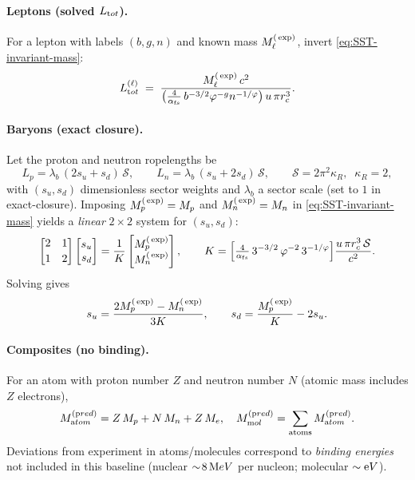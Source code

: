\documentclass[reprint,aps,onecolumn,nofootinbib]{revtex4-2}
\begin{document}
    \paragraph{Leptons (solved $L_{\textrm tot}$).}
        For a lepton with labels $(b,g,n)$ and known mass $M_\ell^{\textrm(\exp)}$, invert \eqref{eq:SST-invariant-mass}:
        \[
            L_{\textrm tot}^{(\ell)} \;=\;
            \frac{M_\ell^{\textrm(\exp)}\,c^2}{\big(\tfrac{4}{\alpha_{\textrm fs}}\,b^{-3/2}\varphi^{-g}n^{-1/\varphi}\big)\,u\,\pi r_c^3}.
        \]

    \paragraph{Baryons (exact closure).}
        Let the proton and neutron ropelengths be
        \[
            L_p=\lambda_b\,(2s_u+s_d)\,\mathcal S,\qquad
            L_n=\lambda_b\,(s_u+2s_d)\,\mathcal S,\qquad
            \mathcal S=2\pi^2\kappa_R,\;\;\kappa_R=2,
        \]
        with $(s_u,s_d)$ dimensionless sector weights and $\lambda_b$ a sector scale (set to $1$ in exact-closure).
        Imposing $M_p^{\textrm(\exp)}=M_p$ and $M_n^{\textrm(\exp)}=M_n$ in \eqref{eq:SST-invariant-mass} yields a \emph{linear} $2\times2$ system for $(s_u,s_d)$:
        \[
            \begin{bmatrix}
            2 & 1\\[2pt]
            1 & 2
            \end{bmatrix}
            \begin{bmatrix}
            s_u\\ s_d
            \end{bmatrix}

            =
            \frac{1}{K}
            \begin{bmatrix}
            M_p^{\textrm(\exp)}\\ M_n^{\textrm(\exp)}
            \end{bmatrix},
            \qquad
            K=\Big[\tfrac{4}{\alpha_{\textrm fs}}\,3^{-3/2}\,\varphi^{-2}\,3^{-1/\varphi}\Big]\frac{u\,\pi r_c^3\,\mathcal S}{c^2}.
        \]
        Solving gives
        \[
            s_u=\frac{2M_p^{\textrm(\exp)}-M_n^{\textrm(\exp)}}{3K},
            \qquad
            s_d=\frac{M_p^{\textrm(\exp)}}{K}-2s_u.
        \]

    \paragraph{Composites (no binding).}
        For an atom with proton number $Z$ and neutron number $N$ (atomic mass includes $Z$ electrons),
        \[
            M_{\textrm atom}^{(\textrm pred)} = Z\,M_p+N\,M_n+Z\,M_e,\quad
            M_{\textrm mol}^{(\textrm pred)}=\sum_{\text{atoms}}M_{\textrm atom}^{(\textrm pred)}.
        \]
        Deviations from experiment in atoms/molecules correspond to \emph{binding energies} not included in this baseline (nuclear $\sim\!8\,{\textrm MeV}$ per nucleon; molecular $\sim{\textrm eV}$).
\end{document}
